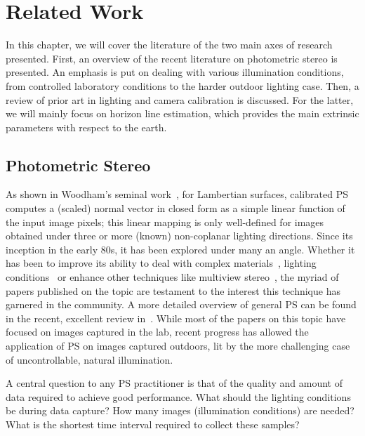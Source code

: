 \chapter{Related Work}

In this chapter, we will cover the literature of the two main axes of research presented. First, an overview of the recent literature on photometric stereo is presented. An emphasis is put on dealing with various illumination conditions, from controlled laboratory conditions to the harder outdoor lighting case. Then, a review of prior art in lighting and camera calibration is discussed. For the latter, we will mainly focus on horizon line estimation, which provides the main extrinsic parameters with respect to the earth.


\section{Photometric Stereo}


As shown in Woodham's seminal work~\cite{woodham-opteng-80}, for Lambertian surfaces, calibrated PS computes a (scaled) normal vector in closed form as a simple linear function of the input image pixels; this linear mapping is only well-defined for images obtained under three or more (known) non-coplanar lighting directions. 
Since its inception in the early 80s, it has been explored under many an angle. Whether it has been to improve its ability to deal with complex materials~\cite{alldrin-cvpr-08}, lighting conditions~\cite{alldrin-cvpr-08,basri-ijcv-07,johnson-cvpr-11,oxholm-eccv-12} or enhance other techniques like multiview stereo~\cite{snavely-ijcv-08}, the myriad of papers published on the topic are testament to the interest this technique has garnered in the community. A more detailed overview of general PS can be found in the recent, excellent review in~\cite{shi-tpami-18}. While most of the papers on this topic have focused on images captured in the lab, recent progress has allowed the application of PS on images captured outdoors, lit by the more challenging case of uncontrollable, natural illumination. 

A central question to any PS practitioner is that of the quality and amount of data required to achieve good performance. What should the lighting conditions be during data capture? How many images (illumination conditions) are needed? What is the shortest time interval required to collect these samples? 

